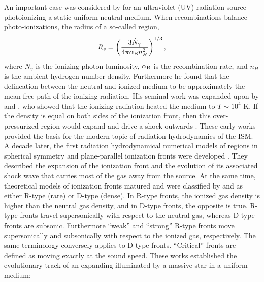 \documentclass[useAMS,usenatbib,a4paper]{mn2e}
\begin{document}
An important case was considered by \citet{Stroemgren39} for an
ultraviolet (UV) radiation source photoionizing a static uniform
neutral medium.  When recombinations balance photo-ionizations, the
radius of a so-called \hii region,
%
\begin{equation}
  \label{eqn:Rstr}
  R_s = \left(\frac{3\dot{N}_\gamma}{4\pi \alpha_{\rm B} n_H^2}\right)^{1/3},
\end{equation}
where $\dot{N}_\gamma$ is the ionizing photon luminosity, $\alpha_{\rm
  B}$ is the recombination rate, and $n_H$ is the ambient hydrogen
number density.  Furthermore he found that the delineation between the
neutral and ionized medium to be approximately the mean free path of
the ionizing radiation.  His seminal work was expanded upon by
\citet{Spitzer48, Spitzer49, Spitzer54} and \citet{Spitzer50}, who
showed that the ionizing radiation heated the medium to $T \sim 10^4$
K.  If the density is equal on both sides of the ionization front,
then this over-pressurized region would expand and drive a shock
outwards \citep[e.g.][]{Oort54, Schatzman55}.  These early works
provided the basis for the modern topic of radiation hydrodynamics of
the ISM.  A decade later, the first radiation hydrodynamical numerical
models of \hii regions in spherical symmetry and plane-parallel
ionization fronts were developed \citep[e.g.][]{Mathews65, Lasker66,
  Hjellming66}.  They described the expansion of the ionization front
and the evolution of its associated shock wave that carries most of
the gas away from the source.  At the same time, theoretical models of
ionization fronts matured and were classified by \citet{Kahn54} and
\citet{Axford61} as either R-type (rare) or D-type (dense).  In R-type
fronts, the ionized gas density is higher than the neutral gas
density, and in D-type fronts, the opposite is true.  R-type fronts
travel supersonically with respect to the neutral gas, whereas D-type
fronts are subsonic.  Furthermore ``weak'' and ``strong'' R-type
fronts move supersonically and subsonically with respect to the
ionized gas, respectively.  The same terminology conversely applies to
D-type fronts.  ``Critical'' fronts are defined as moving exactly at
the sound speed.  These works established the evolutionary track of an
expanding \hii illuminated by a massive star in a uniform medium:
%
\end{document}
